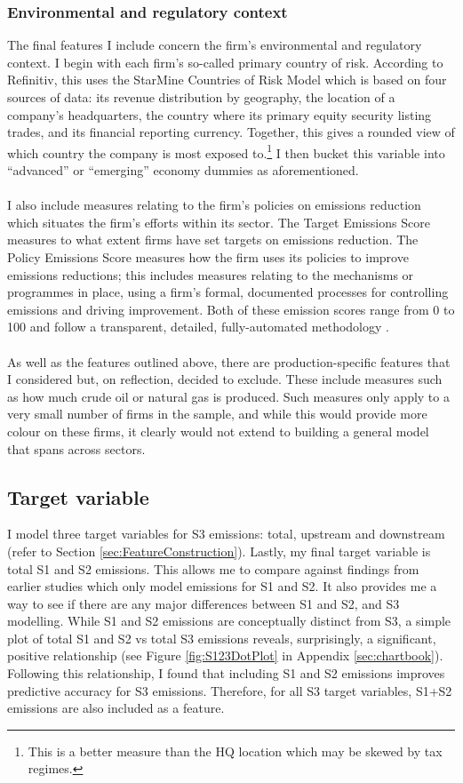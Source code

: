 \documentclass[12pt,twoside]{report}
\begin{document}
\subsubsection{Environmental and regulatory context}
The final features I include concern the firm's environmental and regulatory context. I begin with each firm's so-called primary country of risk. According to Refinitiv, this uses the StarMine Countries of Risk Model which is based on four sources of data: its revenue distribution by geography, the location of a company's headquarters, the country where its primary equity security listing trades, and its financial reporting currency. Together, this gives a rounded view of which country the company is most exposed to.\footnote{This is a better measure than the HQ location which may be skewed by tax regimes.} I then bucket this variable into ``advanced'' or ``emerging'' economy dummies as aforementioned. 
\\\\
I also include measures relating to the firm's policies on emissions reduction which situates the firm's efforts within its sector. The Target Emissions Score measures to what extent firms have set targets on  emissions reduction. The Policy Emissions Score measures how the firm uses its policies to improve emissions reductions; this includes measures relating to the mechanisms or programmes in place, using a firm's formal, documented processes for controlling emissions and driving improvement. Both of these emission scores range from 0 to 100 and follow a transparent, detailed, fully-automated methodology \cite{RefinitivESG2023}.
\\\\
As well as the features outlined above, there are production-specific features that I considered but, on reflection, decided to exclude. These include measures such as how much crude oil or natural gas is produced. Such measures only apply to a very small number of firms in the sample, and while this would provide more colour on these firms, it clearly would not extend to building a general model that spans across sectors.

\subsection{Target variable}
I model three target variables for S3 emissions: total, upstream and downstream (refer to Section \ref{sec:FeatureConstruction}). Lastly, my final target variable is total S1 and S2 emissions. This allows me to compare against findings from earlier studies which only model emissions for S1 and S2. It also provides me a way to see if there are any major differences between S1 and S2, and S3 modelling. While S1 and S2 emissions are conceptually distinct from S3, a simple plot of total S1 and S2 vs total S3 emissions reveals, surprisingly, a significant, positive relationship (see Figure \ref{fig:S123DotPlot} in Appendix \ref{sec:chartbook}). Following this relationship, I found that including S1 and S2 emissions improves predictive accuracy for S3 emissions. Therefore, for all S3 target variables, S1+S2 emissions are also included as a feature.   
\end{document}

